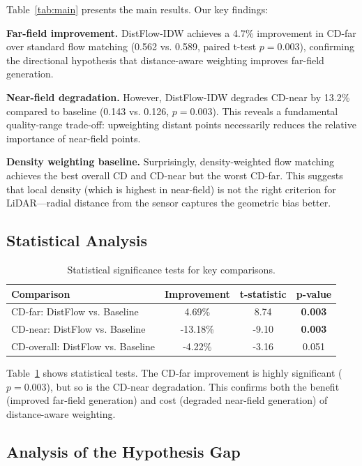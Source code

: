 \documentclass{article}
\begin{document}
Table~\ref{tab:main} presents the main results. Our key findings:

\textbf{Far-field improvement.} DistFlow-IDW achieves a 4.7\% improvement in CD-far over standard flow matching (0.562 vs. 0.589, paired t-test $p=0.003$), confirming the directional hypothesis that distance-aware weighting improves far-field generation.

\textbf{Near-field degradation.} However, DistFlow-IDW degrades CD-near by 13.2\% compared to baseline (0.143 vs. 0.126, $p=0.003$). This reveals a fundamental quality-range trade-off: upweighting distant points necessarily reduces the relative importance of near-field points.

\textbf{Density weighting baseline.} Surprisingly, density-weighted flow matching achieves the best overall CD and CD-near but the worst CD-far. This suggests that local density (which is highest in near-field) is not the right criterion for LiDAR---radial distance from the sensor captures the geometric bias better.

\subsection{Statistical Analysis}

\begin{table}[t]
\caption{Statistical significance tests for key comparisons.}
\label{tab:stats}
\centering
\begin{tabular}{lccc}
\toprule
Comparison & Improvement & t-statistic & p-value \\
\midrule
CD-far: DistFlow vs. Baseline & 4.69\% & 8.74 & \textbf{0.003} \\
CD-near: DistFlow vs. Baseline & -13.18\% & -9.10 & \textbf{0.003} \\
CD-overall: DistFlow vs. Baseline & -4.22\% & -3.16 & 0.051 \\
\bottomrule
\end{tabular}
\end{table}

Table~\ref{tab:stats} shows statistical tests. The CD-far improvement is highly significant ($p=0.003$), but so is the CD-near degradation. This confirms both the benefit (improved far-field generation) and cost (degraded near-field generation) of distance-aware weighting.

\subsection{Analysis of the Hypothesis Gap}
\end{document}

